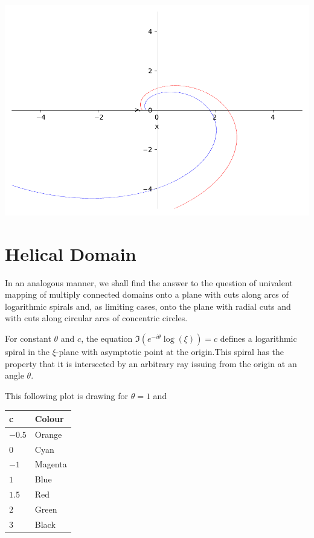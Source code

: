 \documentclass[
]{book}
\theoremstyle{definition}
\theoremstyle{definition}
\theoremstyle{definition}
\theoremstyle{definition}
\theoremstyle{remark}
\begin{document}
\includegraphics{ConformalMapping_files/figure-latex/unnamed-chunk-64-15.pdf}

\chapter{Helical Domain}\label{helical-domain-1}

In an analogous manner, we shall find the answer to the question of univalent mapping of multiply connected domains onto a plane with cuts along arcs of logarithmic spirals and, as limiting cases, onto the plane with radial cuts and with cuts along circular arcs of concentric circles.

For constant \(\theta\) and \(c\), the equation \(\Im(e^{-i\theta}\log(\xi))=c\) defines a logarithmic spiral in the \(\xi\)-plane with asymptotic point at the origin.This spiral has the property that it is intersected by an arbitrary ray issuing from the origin at an angle \(\theta\).

This following plot is drawing for \(\theta=1\) and

\begin{longtable}[]{@{}ll@{}}
\toprule\noalign{}
c & Colour \\
\midrule\noalign{}
\endhead
\bottomrule\noalign{}
\endlastfoot
\(-0.5\) & Orange \\
\(0\) & Cyan \\
\(-1\) & Magenta \\
\(1\) & Blue \\
\(1.5\) & Red \\
\(2\) & Green \\
\(3\) & Black \\
\end{longtable}
\end{document}
